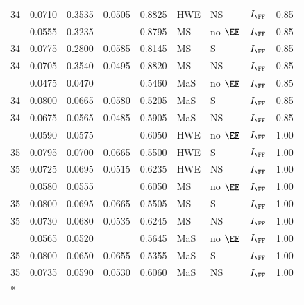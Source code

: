 \begin{longtable}[t]{lllllllll}
34 & 0.0710 & 0.3535 & 0.0505 & 0.8825 & HWE & NS & $I_{\FF}$ & 0.85\\
\addlinespace
34 & 0.0555 & 0.3235 &  & 0.8795 & MS & no $\EE$ & $I_{\FF}$ & 0.85\\
34 & 0.0775 & 0.2800 & 0.0585 & 0.8145 & MS & S & $I_{\FF}$ & 0.85\\
34 & 0.0705 & 0.3540 & 0.0495 & 0.8820 & MS & NS & $I_{\FF}$ & 0.85\\
\addlinespace
34 & 0.0475 & 0.0470 &  & 0.5460 & MaS & no $\EE$ & $I_{\FF}$ & 0.85\\
34 & 0.0800 & 0.0665 & 0.0580 & 0.5205 & MaS & S & $I_{\FF}$ & 0.85\\
34 & 0.0675 & 0.0565 & 0.0485 & 0.5905 & MaS & NS & $I_{\FF}$ & 0.85\\
\addlinespace
35 & 0.0590 & 0.0575 &  & 0.6050 & HWE & no $\EE$ & $I_{\FF}$ & 1.00\\
35 & 0.0795 & 0.0700 & 0.0665 & 0.5500 & HWE & S & $I_{\FF}$ & 1.00\\
35 & 0.0725 & 0.0695 & 0.0515 & 0.6235 & HWE & NS & $I_{\FF}$ & 1.00\\
\addlinespace
35 & 0.0580 & 0.0555 &  & 0.6050 & MS & no $\EE$ & $I_{\FF}$ & 1.00\\
35 & 0.0800 & 0.0695 & 0.0665 & 0.5505 & MS & S & $I_{\FF}$ & 1.00\\
35 & 0.0730 & 0.0680 & 0.0535 & 0.6245 & MS & NS & $I_{\FF}$ & 1.00\\
\addlinespace
35 & 0.0565 & 0.0520 &  & 0.5645 & MaS & no $\EE$ & $I_{\FF}$ & 1.00\\
35 & 0.0800 & 0.0650 & 0.0655 & 0.5355 & MaS & S & $I_{\FF}$ & 1.00\\
35 & 0.0735 & 0.0590 & 0.0530 & 0.6060 & MaS & NS & $I_{\FF}$ & 1.00\\*
\end{longtable}